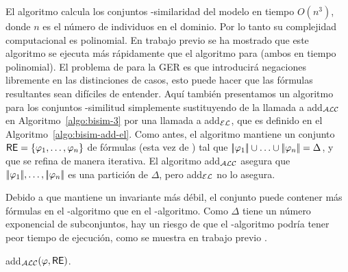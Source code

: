 El algoritmo \alc calcula los conjuntos \alc-similaridad del modelo en
tiempo $O(n^3)$, donde $ n $ es el n\'umero de individuos en el dominio. 
Por lo tanto su complejidad computacional es polinomial. En trabajo previo \cite{areces08} se ha mostrado que este algoritmo se ejecuta m\'as r\'apidamente que el algoritmo para \EL (ambos en tiempo polinomial).
El problema de \alc para la GER es que introducir\'a negaciones libremente en las distinciones de casos, esto
puede hacer que las f\'ormulas resultantes sean dif\'iciles de entender. 
Aqu\'i tambi\'en
presentamos un algoritmo para los conjuntos \el-similitud simplemente sustituyendo de la llamada a add$_{\mathcal{ALC}} $ en
Algoritmo~\ref{algo:bisim-3} por una llamada a add$_{\mathcal{EL}} $, que es
definido en el Algoritmo~\ref{algo:bisim-add-el}. Como antes, el
algoritmo mantiene un conjunto $\textsf{RE} = \{\varphi_1,\ldots,\varphi_n\}$ de
f\'ormulas (esta vez de \el) tal que $|\!|\varphi_1|\!| \cup \ldots
\cup |\!|\varphi_n|\!| = \Delta$, y que se refina de manera iterativa.
El algoritmo add$_{\mathcal{ALC}}$ asegura que
$|\!|\varphi_1|\!|,\ldots,|\!|\varphi_n|\!|$ es una partici\'on de
$ \Delta $, pero add$_{\mathcal{EL}}$ no lo asegura.

Debido a que mantiene un invariante m\'as d\'ebil, el conjunto \RE puede contener
m\'as f\'ormulas en el \el-algoritmo que en el \alc-algoritmo. Como $ \Delta $ tiene un n\'umero exponencial de subconjuntos,
hay un riesgo de que el \el-algoritmo podr\'ia tener peor tiempo de ejecuci\'on, como se muestra en trabajo previo \cite{areces08}.\\

 

\begin{megaalgorithm}[H]%
\caption{add$_\mathcal{ALC}(\varphi,\textsf{RE})$.}
\label{algo:bisim-add-alc}
\end{megaalgorithm}

